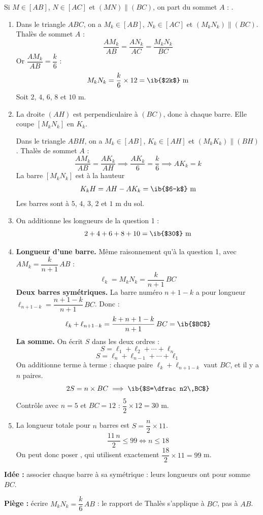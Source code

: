 \begin{prop}[Thalès]
Si $M\in[AB]$, $N\in[AC]$ et $(MN)\parallel(BC)$, on part du sommet $A$ : .
\end{prop}
\begin{enumerate}
  \item Dans le triangle $ABC$, on a $M_k\in[AB]$, $N_k\in[AC]$ et $(M_kN_k)\parallel(BC)$. Thalès de sommet $A$ :
  \[\dfrac{AM_k}{AB}=\dfrac{AN_k}{AC}=\dfrac{M_kN_k}{BC}\]
  Or $\dfrac{AM_k}{AB}=\dfrac k6$ :
  \[M_kN_k=\dfrac k6\times12=\ib{$2k$}\ \text{m}\]
  Soit $2$, $4$, $6$, $8$ et $10$ m.

  \item La droite $(AH)$ est perpendiculaire à $(BC)$, donc à chaque barre. Elle coupe $[M_kN_k]$ en $K_k$.

  Dans le triangle $ABH$, on a $M_k\in[AB]$, $K_k\in[AH]$ et $(M_kK_k)\parallel(BH)$. Thalès de sommet $A$ :
  \[\dfrac{AM_k}{AB}=\dfrac{AK_k}{AH}\implies\dfrac{AK_k}6=\dfrac k6\implies AK_k=k\]
  La barre $[M_kN_k]$ est à la hauteur
  \[K_kH=AH-AK_k=\ib{$6-k$}\ \text{m}\]
  Les barres sont à $5$, $4$, $3$, $2$ et $1$ m du sol.

  \item On additionne les longueurs de la question 1 :
  \[2+4+6+8+10=\ib{$30$}\ \text{m}\]

  \item \textbf{Longueur d'une barre.} Même raisonnement qu'à la question 1, avec $AM_k=\dfrac k{n+1}\,AB$ :
  \[\ell_k=M_kN_k=\dfrac k{n+1}\,BC\]
  \textbf{Deux barres symétriques.} La barre numéro $n+1-k$ a pour longueur $\ell_{n+1-k}=\dfrac{n+1-k}{n+1}\,BC$. Donc :
  \[\ell_k+\ell_{n+1-k}=\dfrac{k+n+1-k}{n+1}\,BC=\ib{$BC$}\]
  \textbf{La somme.} On écrit $S$ dans les deux ordres :
  \[S=\ell_1+\ell_2+\cdots+\ell_n\]
  \[S=\ell_n+\ell_{n-1}+\cdots+\ell_1\]
  On additionne terme à terme : chaque paire $\ell_k+\ell_{n+1-k}$ vaut $BC$, et il y a $n$ paires.
  \[2S=n\times BC\implies\ib{$S=\dfrac n2\,BC$}\]
  Contrôle avec $n=5$ et $BC=12$ : $\dfrac52\times12=30$ m.

  \item La longueur totale pour $n$ barres est $S=\dfrac n2\times11$.
  \[\dfrac{11\,n}2\leq99\iff n\leq18\]
  On peut donc poser , qui utilisent exactement $\dfrac{18}2\times11=99$ m.
\end{enumerate}
\textbf{Idée :} associer chaque barre à sa symétrique : leurs longueurs ont pour somme $BC$.

\textbf{Piège :} écrire $M_kN_k=\dfrac k6\,AB$ : le rapport de Thalès s'applique à $BC$, pas à $AB$.
